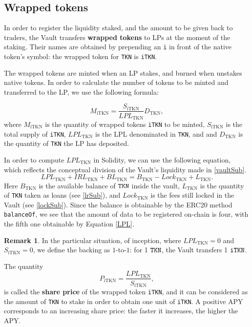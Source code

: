 \documentclass[a4paper,10 pt]{article}
\theoremstyle{definition}
\newtheorem{remark}{Remark}
\begin{document}
\subsection{Wrapped tokens}\label{wtSub}

In order to register the liquidity staked, and the amount to be given back to traders, the Vault transfers {\bf wrapped tokens} to LPs at the moment of the staking.
Their names are obtained by prepending an \verb|i| in front of the native token's symbol: the wrapped token for \verb|TKN| is \verb|iTKN|.

The wrapped tokens are minted when an LP stakes, and burned when unstakes native tokens. In order to calculate the number of tokens to be minted and transferred to the LP, we use the following formula:

\begin{equation}\label{wrappedtokens}
M_{\text{iTKN}} = \frac{S_{\text{iTKN}}}{LPL_{\text{TKN}}}D_{\text{TKN}},
\end{equation}
where $M_{\text{iTKN}}$ is the quantity of wrapped tokens \verb|iTKN| to be minted, $S_{\text{iTKN}}$ is the total supply of \verb|iTKN|, $LPL_{\text{TKN}}$ is the LPL denominated in \verb|TKN|, and  and $D_\text{TKN}$ is the quantity of \verb|TKN| the LP has deposited. 

In order to compute $LPL_{\text{TKN}}$ in Solidity, we can use the following equation, which reflects the conceptual division of the Vault's liquidity made in \ref{vaultSub}.
\begin{equation}\label{LPL}
LPL_\text{TKN} + IRL_{\text{TKN}} + BL_{\text{TKN}} = B_{\text{TKN}} - Lock_{\text{TKN}} + L_{\text{TKN}} .
\end{equation}
Here $B_{\text{TKN}}$ is the available balance of $\verb|TKN|$ inside the vault, $L_{\text{TKN}}$ is the quantity of \verb|TKN| taken as loans (see \ref{lrSub}), and $Lock_{\text{TKN}}$ is the fees still locked in the Vault (see \ref{lockSub}). Since the balance is obtainable by the ERC20 method \verb|balanceOf|, we see that the amount of data to be registered on-chain is four, with the fifth one obtainable by Equation \eqref{LPL}.

\begin{remark}
In the particular situation, of inception, where $LPL_{\text{TKN}} = 0$ and $S_{\text{iTKN}} = 0$, we define the backing as $1$-to-$1$: for 1 $\verb|TKN|$, the Vault transfers 1 $\verb|iTKN|$.
\end{remark}

The quantity 
\begin{equation}\label{shareprice}
P_{\text{iTKN}} = \frac{LPL_{\text{TKN}}}{S_{\text{iTKN}}},
\end{equation} 
is called the {\bf share price} of the wrapped token \verb|iTKN|, and it can be considered as the amount of \verb|TKN| to stake in order to obtain one unit of \verb|iTKN|. A positive APY corresponds to an increasing share price: the faster it increases, the higher the APY.
\end{document}
